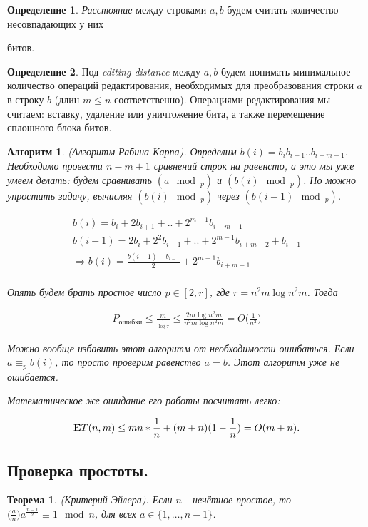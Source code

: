 \documentclass[a4paper]{article}
\theoremstyle{indented}
\newtheorem{theorem}{Теорема}
\newtheorem{alg}{Алгоритм}
\theoremstyle{definition}
\newtheorem{defn}{Определение}
\theoremstyle{remark}
\newcommand{\bea}{\begin{eqnarray*}}
\newcommand{\eea}{\end{eqnarray*}}
\newcommand{\be}{\begin{eqnarray}}
\newcommand{\ee}{\end{eqnarray}}
\begin{document}
\begin{defn}
\textit{Расстояние} между строками $a, b$ будем считать количество несовпадающих у них
 
битов.
\end{defn}

\begin{defn}
Под \textit{editing distance} между $a, b$ будем понимать минимальное количество операций редактирования, необходимых для преобразования строки $a$ в строку $b$ (длин $m\leq n$ соответственно). Операциями редактирования мы считаем: вставку, удаление или уничтожение бита, а также перемещение сплошного блока битов.
\end{defn}

\begin{alg}
(Алгоритм Рабина-Карпа). Определим $b(i)=b_ib_{i+1} .. b_{i+m-1}$. Необходимо провести $n-m+1$ сравнений строк на равенсто, а это мы уже умеем делать: будем сравнивать $(a \mod_p)$ и $(b(i) \mod_p)$. Но можно упростить задачу, вычисляя $(b(i) \mod_p)$ через $(b(i-1) \mod_p)$. 

\bea
b(i)=b_i + 2b_{i+1} + .. + 2^{m-1}b_{i+m-1} \\
b(i-1)=2b_i + 2^2b_{i+1}+ .. +2^{m-1}b_{i+m-2}+b_{i-1} \\
\Rightarrow b(i)=\frac{b(i-1)-b_{i-1}}{2}+2^{m-1}b_{i+m-1} \\
\eea

Опять будем брать простое число $p \in [2, r]$, где $r = n^2m\log n^2 m$. Тогда

\be
P_{\text{ошибки}}\leq
\frac{m}{\frac{\tau}{\log \tau}} \leq
\frac{2m\log n^2m}{n^2m \log n^2m} =
O\biggl(\frac{1}{n^2}\biggr)
\ee

Можно вообще избавить этот алгоритм от необходимости ошибаться. Если $a\equiv_p b(i)$, то просто проверим равенство $a=b$. Этот алгоритм уже не ошибается. \ 

Математическое же ошидание его работы посчитать легко:

\be
{\bf E}T(n,m) \leq mn*\frac{1}{n}+(m+n)(1-\frac{1}{n})=
O(m+n).
\ee

\end{alg}

\subsection{Проверка простоты.} 

\begin{theorem}
(Критерий Эйлера). Если $n$ - нечётное простое, то $\biggl( \frac{a}{n} \biggr) a^{\frac{n-1}{2}} \equiv 1 \mod n$, для всех $a \in \{1, \ldots, n-1\}$. 
\end{theorem} \ 
\end{document}
